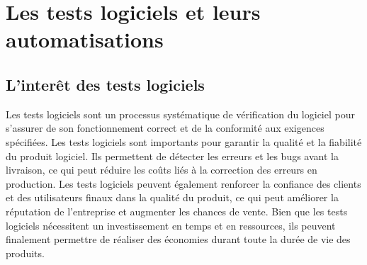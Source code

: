 \chapter{Les tests logiciels et leurs automatisations}
\thispagestyle{fancy}

\section{L'interêt des tests logiciels}
\label{sec:interet}
Les tests logiciels sont un processus systématique de vérification du logiciel pour s'assurer de son fonctionnement correct et de la conformité aux exigences spécifiées.
Les tests logiciels sont importants pour garantir la qualité et la fiabilité du produit logiciel. Ils permettent de détecter les erreurs et les bugs avant la livraison, ce qui peut réduire les coûts liés à la correction des erreurs en production. Les tests logiciels peuvent également renforcer la confiance des clients et des utilisateurs finaux dans la qualité du produit, ce qui peut améliorer la réputation de l'entreprise et augmenter les chances de vente. Bien que les tests logiciels nécessitent un investissement en temps et en ressources, ils peuvent finalement permettre de réaliser des économies durant toute la durée de vie des produits.\parencite{classification}

